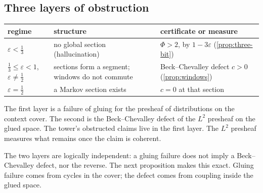 \documentclass[11pt]{article}
\theoremstyle{definition}
\begin{document}
\subsection{Three layers of obstruction}
\begin{center}\small
\begin{tabular}{>{\raggedright}p{2.6cm}>{\raggedright}p{4.6cm}>{\raggedright\arraybackslash}p{6.6cm}}\toprule
regime & structure & certificate or measure\\\midrule
$\varepsilon<\tfrac13$ & no global section (hallucination) & $\Phi>2$, by $1-3\varepsilon$ (\cref{prop:three-bit})\\
$\tfrac13\le\varepsilon<1$, $\varepsilon\ne\tfrac12$ & sections form a segment; windows do not commute & Beck--Chevalley defect $c>0$ (\cref{prop:windows})\\
$\varepsilon=\tfrac12$ & a Markov section exists & $c=0$ at that section\\
\bottomrule
\end{tabular}
\end{center}
The first layer is a failure of gluing for the presheaf of distributions on the context cover. The second is the Beck--Chevalley defect
of the $L^2$ presheaf on the glued space. The tower's obstructed claims live in the first layer. The $L^2$ presheaf measures what
remains once the claim is coherent.

The two layers are logically independent: a gluing failure does not imply a Beck--Chevalley defect, nor the reverse. The next
proposition makes this exact. Gluing failure comes from cycles in the cover; the defect comes from coupling inside the glued space.
\end{document}
